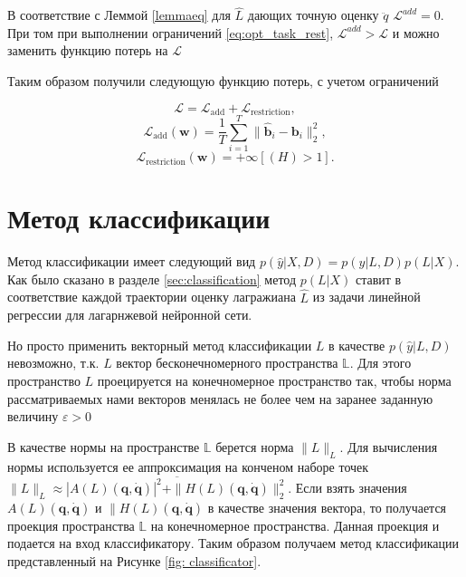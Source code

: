 \documentclass[a4paper, 12pt]{article}
\renewcommand{\epsilon}{\ensuremath{\varepsilon}}
\begin{document}
В соответствие с Леммой \ref{lemmaeq} для $\hat{L}$ дающих точную оценку $\ddot{q}$ $\mathcal{L}^{add} = 0$. При том при выполнении ограничений \eqref{eq:opt_task_rest}, $\mathcal{L}^{add} > \mathcal{L}$ и можно заменить функцию потерь на $\mathcal{L}$

Таким образом получили следующую функцию потерь, с учетом ограничений

\begin{equation}
    \mathcal{L} = \mathcal{L}_\text{add} + \mathcal{L}_\text{restriction},
\end{equation}
\begin{equation}
    \mathcal{L}_\text{add}(\textbf{w}) = \frac{1}{T}\sum_{i=1}^{T} \| \mathbf{\hat{b}}_i - \mathbf{b}_i \|_2^2,
\end{equation}
\begin{equation}
    \mathcal{L}_\text{restriction}(\textbf{w}) = +\infty[\left(H\right) > 1].
\end{equation}

\section {Метод классификации}

Метод классификации имеет следующий вид $p(\hat{y}|X, D) = p(\hat{y}|L, D)p(L|X)$. Как было сказано в разделе \ref{sec:classification} метод $p(L|X)$ ставит в соответствие каждой траектории оценку лагражиана $\hat{L}$ из задачи линейной регрессии для лагарнжевой нейронной сети. 

Но просто применить векторный метод классификации $L$ в качестве $p(\hat{y}|L, D)$ невозможно, т.к. $L$ вектор бесконечномерного пространства $\mathbb{L}$. Для этого пространство $L$ проецируется на конечномерное пространство так, чтобы норма рассматриваемых нами векторов менялась не более чем на заранее заданную величину $\epsilon > 0$

В качестве нормы на пространстве $\mathbb{L}$ берется норма $\|L\|_L$. Для вычисления нормы используется ее аппроксимация на конченом наборе точек $\|L\|_L \approx \overline{|A(L)\left(\mathbf{q}, \dot{\mathbf{q}}\right)|^2 + \|H(L)\left(\mathbf{q}, \dot{\mathbf{q}}\right)\|_2^2}$. Если взять значения $A(L)\left(\mathbf{q}, \dot{\mathbf{q}}\right)$ и $\|H(L)\left(\mathbf{q}, \dot{\mathbf{q}}\right)$ в качестве значения вектора, то получается проекция пространства $\mathbb{L}$ на конечномерное пространства. Данная проекция и подается на вход классификатору. Таким образом получаем метод классификации представленный на Рисунке \ref{fig: classificator}.
\end{document}
